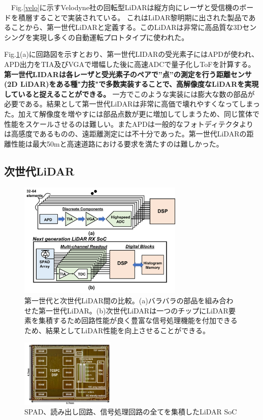 \documentclass[twocolumn, 11pt, a4j]{article}
\begin{document}
　Fig.\ref{velo}に示すVelodyne社の回転型LiDAR\cite{velodyne, velopatent}は縦方向にレーザと受信機のボードを積層することで実装されている。
これはLiDAR黎明期に出された製品であることから、第一世代LiDARと定義する\cite{yoshiokaieice}。このLiDARは非常に高品質な3Dセンシングを実現し多くの自動運転プロトタイプに使われた\cite{montemerlo2008junior}。

Fig.\ref{next}(a)に回路図を示すとおり、第一世代LIDARの受光素子にはAPDが使われ、APD出力をTIA及びVGAで増幅した後に高速ADCで量子化しToFを計算する。
\textbf{第一世代LIDARは各レーザと受光素子のペアで”点”の測定を行う距離センサ(2D LiDAR)をある種"力技"で多数実装することで、高解像度なLiDARを実現していると捉えることができる。}
一方でこのような実装には膨大な数の部品が必要である。結果として第一世代LiDARは非常に高価で壊れやすくなってしまった。加えて解像度を増やすには部品点数が更に増加してしまうため、同じ筐体で性能をスケールさせるのは難しい。またAPDは一般的なフォトディテクタよりは高感度であるものの、遠距離測定には不十分であった。第一世代LiDARの距離性能は最大50mと高速道路における要求を満たすのは難しかった。

\subsection{次世代LiDAR}
\begin{figure}[!t]
\centering
 \includegraphics[width=0.7\textwidth]{figs/nextlidar.png}
  \caption{第一世代と次世代LiDAR間の比較。(a)バラバラの部品を組み合わせた第一世代LiDAR。(b)次世代LiDARは一つのチップにLiDAR要素を集積するため回路性能が良く豊富な信号処理機能を付加できるため、結果としてLiDAR性能を向上させることができる。}
\label{next}
\end{figure}

\begin{figure}[!t]
\centering
 \includegraphics[width=0.4\textwidth]{figs/niclasschip.png}
  \caption{SPAD、読み出し回路、信号処理回路の全てを集積したLiDAR SoC \cite{niclass2012100}}
\label{chip}
\end{figure}
\end{document}
